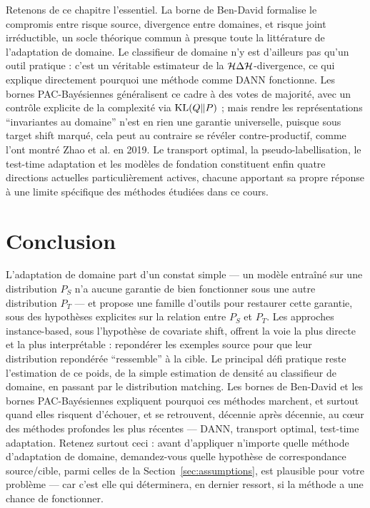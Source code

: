 \documentclass[11pt]{article}
\begin{document}
Retenons de ce chapitre l'essentiel. La borne de Ben-David formalise le compromis entre risque source,
divergence entre domaines, et risque joint irréductible, un socle théorique commun à presque toute la
littérature de l'adaptation de domaine. Le classifieur de domaine n'y est d'ailleurs pas qu'un outil
pratique : c'est un véritable estimateur de la $\mathcal{H}\Delta\mathcal{H}$-divergence, ce qui explique directement
pourquoi une méthode comme DANN fonctionne. Les bornes PAC-Bayésiennes généralisent ce cadre à des votes
de majorité, avec un contrôle explicite de la complexité via $\operatorname{KL}(Q\|P)$ ; mais rendre les représentations
\enquote{invariantes au domaine} n'est en rien une garantie universelle, puisque sous target shift
marqué, cela peut au contraire se révéler contre-productif, comme l'ont montré Zhao et al. en 2019. Le
transport optimal, la pseudo-labellisation, le test-time adaptation et les modèles de fondation
constituent enfin quatre directions actuelles particulièrement actives, chacune apportant sa propre
réponse à une limite spécifique des méthodes étudiées dans ce cours.

\section{Conclusion}

L'adaptation de domaine part d'un constat simple --- un modèle entraîné sur une distribution $P_S$ n'a
aucune garantie de bien fonctionner sous une autre distribution $P_T$ --- et propose une famille
d'outils pour restaurer cette garantie, sous des hypothèses explicites sur la relation entre $P_S$ et
$P_T$. Les approches instance-based, sous l'hypothèse de covariate shift, offrent la voie la plus directe
et la plus interprétable : repondérer les exemples source pour que leur distribution repondérée
\enquote{ressemble} à la cible. Le principal défi pratique reste l'estimation de ce poids, de la simple
estimation de densité au classifieur de domaine, en passant par le distribution matching. Les bornes de
Ben-David et les bornes PAC-Bayésiennes expliquent pourquoi ces méthodes marchent, et surtout quand elles
risquent d'échouer, et se retrouvent, décennie après décennie, au cœur des méthodes profondes les plus
récentes --- DANN, transport optimal, test-time adaptation. Retenez surtout ceci : avant d'appliquer
n'importe quelle méthode d'adaptation de domaine, demandez-vous quelle hypothèse de correspondance
source/cible, parmi celles de la Section~\ref{sec:assumptions}, est plausible pour votre problème --- car
c'est elle qui déterminera, en dernier ressort, si la méthode a une chance de fonctionner.
\end{document}
